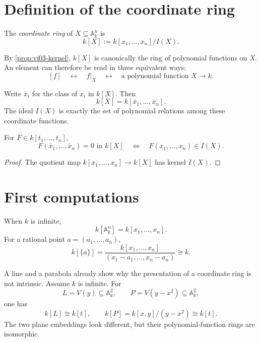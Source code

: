 \section{Definition of the coordinate ring}
\label{sec:vi03-definition}

\begin{definition}
The \emph{coordinate ring} of \(X\subseteq\mathbb A_k^n\) is
\[
  k[X]:=k[x_1,\dots,x_n]/I(X).
\]
\end{definition}

By \cref{prop:vi03-kernel}, \(k[X]\) is canonically the ring of polynomial functions on
\(X\).  An element can therefore be read in three equivalent ways:
\[
\boxed{[f]\quad\longleftrightarrow\quad f|_X\quad\longleftrightarrow\quad
\text{a polynomial function }X\to k.}
\]

Write \(\bar x_i\) for the class of \(x_i\) in \(k[X]\).  Then
\[
  k[X]=k[\bar x_1,\dots,\bar x_n].
\]
The ideal \(I(X)\) is exactly the set of polynomial relations among these coordinate
functions.

\begin{proposition}
For \(F\in k[t_1,\dots,t_n]\),
\[
F(\bar x_1,\dots,\bar x_n)=0\text{ in }k[X]
\quad\Longleftrightarrow\quad
F(x_1,\dots,x_n)\in I(X).
\]
\end{proposition}

\begin{proof}
The quotient map \(k[x_1,\dots,x_n]\to k[X]\) has kernel \(I(X)\).
\end{proof}

\section{First computations}
\label{sec:vi03-first-computations}

When \(k\) is infinite,
\[
k[\mathbb A_k^n]=k[x_1,\dots,x_n].
\]
For a rational point \(a=(a_1,\dots,a_n)\),
\[
k[\{a\}]
=\frac{k[x_1,\dots,x_n]}{(x_1-a_1,\dots,x_n-a_n)}\cong k.
\]

A line and a parabola already show why the presentation of a coordinate ring is not
intrinsic.  Assume \(k\) is infinite.  For
\[
L=V(y)\subseteq\mathbb A_k^2,
\qquad
P=V(y-x^2)\subseteq\mathbb A_k^2,
\]
one has
\[
k[L]\cong k[t],
\qquad
k[P]=k[x,y]/(y-x^2)\cong k[t].
\]
The two plane embeddings look different, but their polynomial-function rings are
isomorphic.

